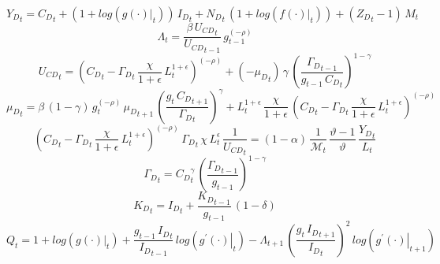 \documentclass[10pt,a4paper]{article}
\begin{document}
\begin{dmath}
{Y_D}_{t}={C_D}_{t}+\left(1+log\left({\left.       g\left( \cdot \right)            \right|}_{t}\right)\right)\, {I_D}_{t}+{N_D}_{t}\, \left(1+log\left({\left.       f\left( \cdot \right)            \right|}_{t}\right)\right)+\left({Z_D}_{t}-1\right)\, {M}_{t}
\end{dmath}
\begin{dmath}
{\Lambda}_{t}=\frac{\beta\, {U_{CD}}_{t}}{{U_{CD}}_{t-1}}\, {g}_{t-1}^{\left(-\rho\right)}
\end{dmath}
\begin{dmath}
{U_{CD}}_{t}=\left({C_D}_{t}-{\Gamma_D}_{t}\, \frac{\chi}{1+\epsilon}\, {L}_{t}^{1+\epsilon}\right)^{\left(-\rho\right)}+\left(-{{\mu}_{D}}_{t}\right)\, \gamma\, \left(\frac{{\Gamma_D}_{t-1}}{{g}_{t-1}\, {C_D}_{t}}\right)^{1-\gamma}
\end{dmath}
\begin{dmath}
{{\mu}_{D}}_{t}=\beta\, \left(1-\gamma\right)\, {g}_{t}^{\left(-\rho\right)}\, {{\mu}_{D}}_{t+1}\, \left(\frac{{g}_{t}\, {C_D}_{t+1}}{{\Gamma_D}_{t}}\right)^{\gamma}+{L}_{t}^{1+\epsilon}\, \frac{\chi}{1+\epsilon}\, \left({C_D}_{t}-{\Gamma_D}_{t}\, \frac{\chi}{1+\epsilon}\, {L}_{t}^{1+\epsilon}\right)^{\left(-\rho\right)}
\end{dmath}
\begin{dmath}
\left({C_D}_{t}-{\Gamma_D}_{t}\, \frac{\chi}{1+\epsilon}\, {L}_{t}^{1+\epsilon}\right)^{\left(-\rho\right)}\, {\Gamma_D}_{t}\, \chi\, {L}_{t}^{\epsilon}\, \frac{1}{{U_{CD}}_{t}}=\left(1-\alpha\right)\, \frac{1}{{\mathcal{M}}_{t}}\, \frac{\vartheta-1}{\vartheta}\, \frac{{Y_D}_{t}}{{L}_{t}}
\end{dmath}
\begin{dmath}
{\Gamma_D}_{t}={C_D}_{t}^{\gamma}\, \left(\frac{{\Gamma_D}_{t-1}}{{g}_{t-1}}\right)^{1-\gamma}
\end{dmath}
\begin{dmath}
{K_D}_{t}={I_D}_{t}+\frac{{K_D}_{t-1}}{{g}_{t-1}}\, \left(1-\delta\right)
\end{dmath}
\begin{dmath}
{Q}_{t}=1+log\left({\left.       g\left( \cdot \right)            \right|}_{t}\right)+\frac{{g}_{t-1}\, {I_D}_{t}}{{I_D}_{t-1}}\, log\left({\left.       g^{\prime}\left( \cdot \right)   \right|}_{t}\right)-{\Lambda}_{t+1}\, \left(\frac{{g}_{t}\, {I_D}_{t+1}}{{I_D}_{t}}\right)^{2}\, log\left({\left.       g^{\prime}\left( \cdot \right)   \right|}_{t+1}\right)
\end{dmath}
\end{document}
